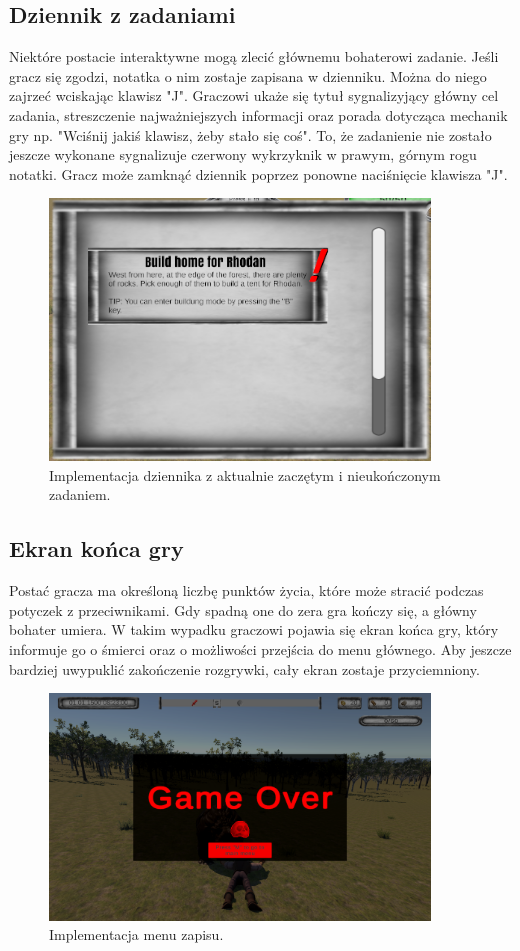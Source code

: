 \subsection{Dziennik z zadaniami}
Niektóre postacie interaktywne mogą zlecić głównemu bohaterowi zadanie. Jeśli gracz się zgodzi, notatka o nim zostaje zapisana w dzienniku. Można do niego zajrzeć
wciskając klawisz "J". Graczowi ukaże się tytuł sygnalizyjący główny cel zadania, streszczenie najważniejszych informacji oraz porada dotycząca mechanik gry np. 
"Wciśnij jakiś klawisz, żeby stało się coś". To, że zadanienie nie zostało jeszcze wykonane sygnalizuje czerwony wykrzyknik w prawym, górnym rogu notatki. Gracz może 
zamknąć dziennik poprzez ponowne naciśnięcie klawisza "J".
\begin{figure}[htbp]
    \centering
    \includegraphics[width=0.9\textwidth]{images/ui/journal_quest.png}
    \caption{Implementacja dziennika z aktualnie zaczętym i nieukończonym zadaniem.}\label{fig:end_sc}
\end{figure}

\subsection{Ekran końca gry}
Postać gracza ma określoną liczbę punktów życia, które może stracić podczas potyczek z przeciwnikami. Gdy spadną one do zera gra kończy się, a główny bohater umiera.
W takim wypadku graczowi pojawia się ekran końca gry, który informuje go o śmierci oraz o możliwości przejścia do menu głównego. Aby jeszcze bardziej uwypuklić zakończenie 
rozgrywki, cały ekran zostaje przyciemniony.
\begin{figure}[htbp]
    \centering
    \includegraphics[width=0.9\textwidth]{images/ui/endgame_screen.png}
    \caption{Implementacja menu zapisu.}\label{fig:end_sc}
\end{figure}